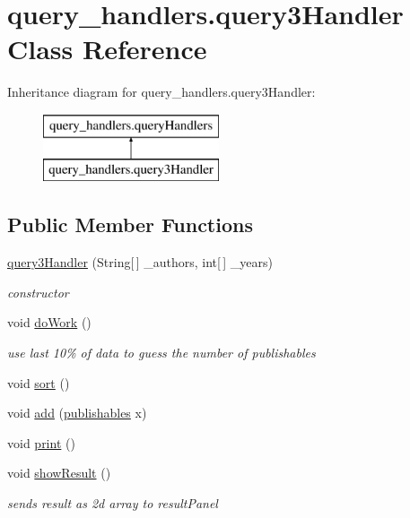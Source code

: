 \hypertarget{classquery__handlers_1_1query3_handler}{}\section{query\+\_\+handlers.\+query3\+Handler Class Reference}
\label{classquery__handlers_1_1query3_handler}
Inheritance diagram for query\+\_\+handlers.\+query3\+Handler\+:\begin{figure}[H]
\begin{center}
\leavevmode
\includegraphics[height=2.000000cm]{classquery__handlers_1_1query3_handler}
\end{center}
\end{figure}
\subsection*{Public Member Functions}
\begin{DoxyCompactItemize}
\item 
\hyperlink{classquery__handlers_1_1query3_handler_aa874c1b45238e159383eb3d7ebf7efaa}{query3\+Handler} (String\mbox{[}$\,$\mbox{]} \+\_\+authors, int\mbox{[}$\,$\mbox{]} \+\_\+years)
\begin{DoxyCompactList}\small\item\em constructor \end{DoxyCompactList}\item 
void \hyperlink{classquery__handlers_1_1query3_handler_aca11896ec7db39b698a6c793837dc2fc}{do\+Work} ()
\begin{DoxyCompactList}\small\item\em use last 10\% of data to guess the number of publishables \end{DoxyCompactList}\item 
void \hyperlink{classquery__handlers_1_1query3_handler_a361412515dada11bc03c4f960a141d62}{sort} ()
\item 
void \hyperlink{classquery__handlers_1_1query3_handler_a19b8a0235fc333924fdc0948ea8cf856}{add} (\hyperlink{class_data_1_1publishables}{publishables} x)
\item 
void \hyperlink{classquery__handlers_1_1query3_handler_a62b09c05939d04c105e6f7f338931162}{print} ()
\item 
void \hyperlink{classquery__handlers_1_1query3_handler_a44fdc62828b748b374705c862515fe23}{show\+Result} ()
\begin{DoxyCompactList}\small\item\em sends result as 2d array to result\+Panel \end{DoxyCompactList}\end{DoxyCompactItemize}


